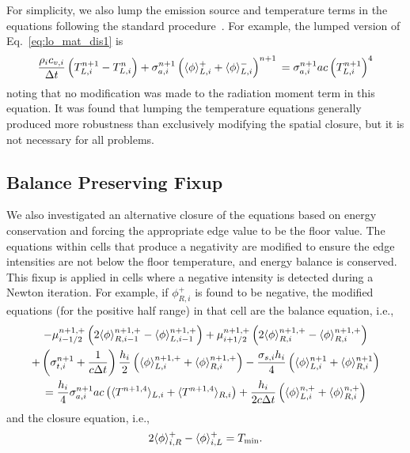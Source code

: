 For simplicity,
we also lump the emission source and temperature terms in the equations following the
standard procedure~\cite{morel_ldtrt}.  For example, the lumped version of Eq.~\eqref{eq:lo_mat_dis1}
is
\begin{equation}\label{eq:lumped_mat}
     \frac{\rho_i c_{v,i}}{\Delta t}\left(T_{L,i}^{n+1} - T_{L,i}^{n}\right)  + \sigma_{a,i}^{n+1} \left( \langle \phi \rangle_{L,i}^+ +
    \langle \phi \rangle_{L,i}^- \right)^{n+1} \\ = \sigma_{a,i}^{n+1}a c
    \left( T_{L,i}^{n+1}\right)^4
    \end{equation}
noting that no modification was made to the radiation moment term in this equation.  It was found that
lumping the temperature equations generally produced more robustness than exclusively
modifying the spatial closure, but it is not necessary for all problems.

\subsection{Balance Preserving Fixup}

We also investigated an alternative closure of the equations based on energy conservation
and forcing the appropriate edge value to be the floor value.
The equations within cells that produce a negativity are modified to ensure the edge
intensities are not below the floor temperature, and energy balance is
conserved.  This fixup is applied in cells where a negative intensity is detected during
a Newton iteration.  For example, if $\phi^+_{R,i}$
is found to be negative, the modified equations (for the positive half range) in that cell are
the balance equation, i.e., 
\begin{multline}\label{eq:floor_outflow}
    -{\mu}_{i-1/2}^{n+1,+} \left(2\langle \phi \rangle_{R,i-1}^{n+1,+} -   \langle \phi \rangle_{L,i-1}^{n+1,+}      \right) +
    {\mu}_{i+1/2}^{n+1,+} \left(2\langle \phi \rangle_{R,i}^{n+1,+} -
    \langle \phi \rangle_{R,i}^{n+1,+}\right) \\       
   +  \left(\sigma_{t,i}^{n+1}+\frac{1}{c \Delta t} \right)
  \frac{h_i}{2} \left(\langle \phi \rangle_{L,i}^{n+1,+} + \langle \phi \rangle_{R,i}^{n+1,+}\right) -  \frac{\sigma_{s,i} h_i}{4} \left( \langle \phi \rangle_{L,i}^{n+1} +
  \langle \phi \rangle_{R,i}^{n+1}\right)\\  = \frac{h_i}{4} \sigma_{a,i}^{n+1} a c \left(
    \langle T^{n+1,4} \rangle_{L,i} + \langle T^{n+1,4} \rangle_{R,i} \right) +
  \frac{h_i}{2c\Delta t}\left(\langle \phi \rangle_{L,i}^{n,+} + \langle \phi \rangle_{R,i}^{n,+}\right)
\end{multline}
and the closure equation, i.e., 
\begin{equation}\label{eq:clos_outflow}
    2\langle \phi \rangle_{i,R}^+ - \langle \phi \rangle_{i,L}^+ = T_{\min}.
\end{equation}

